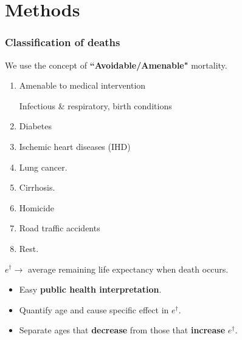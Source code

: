 \documentclass[xcolor={dvipsnames}]{beamer}
\begin{document}
\section{Methods}

\begin{frame}\frametitle{Classification of deaths}
\large{
\begin{center} We use the concept of \textbf{``Avoidable/Amenable"} mortality. \end{center}
		\begin{enumerate}
		
		
\color{blue} 		\item Amenable to medical intervention \begin{tiny}Infectious \& respiratory, birth conditions\end{tiny}

\pause

\color{ForestGreen}		\item Diabetes
		
		\item Ischemic heart diseases (IHD)
		
		\item Lung cancer.
		 
		\item Cirrhosis.
		
\pause
		
\color{red}		\item Homicide
		
		\item Road traffic accidents
		
		\pause
		
\color{gray}				\item Rest.

		
		\end{enumerate}			

}
\end{frame}


\begin{frame}

\Large{
$e^{\dagger}\longrightarrow  $ average remaining life expectancy when death occurs.

\begin{itemize}
\item Easy \textbf{public health interpretation}.
\pause
\item Quantify age and cause specific effect in $e^{\dagger}$.
\pause
\item Separate ages that \textbf{decrease} from those that \textbf{increase} $e^{\dagger}$.
\end{itemize}

}
\end{frame}
\end{document}
